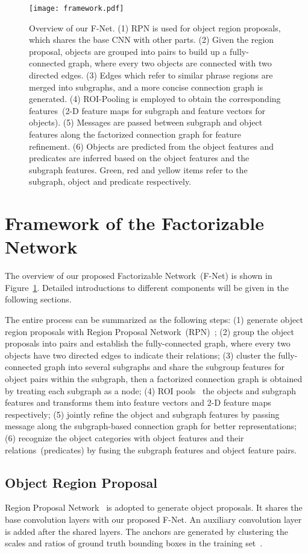 \documentclass[runningheads]{llncs}
\begin{document}
\begin{figure}[t]
	\texttt{[image: framework.pdf]}
	\caption{Overview of our F-Net. (1) RPN is used for object region proposals, which shares the base CNN with other parts. (2) Given the region proposal, objects are grouped into pairs to build up a fully-connected graph, where every two objects are connected with two directed edges. (3) Edges which refer to similar phrase regions are merged into subgraphs, and a more concise connection graph is generated. (4) ROI-Pooling is employed to obtain the corresponding features~(2-D feature maps for subgraph and feature vectors for objects). (5) Messages are passed between subgraph and object features along the factorized connection graph for feature refinement. (6) Objects are predicted from the object features and predicates are inferred based on the object features and the subgraph features. Green, red and yellow items refer to the subgraph, object and predicate respectively.}
	\label{fig:framework}
\end{figure}

\section{Framework of the Factorizable Network}

The overview of our proposed Factorizable Network~(F-Net) is shown in Figure~\ref{fig:framework}. Detailed introductions to different components will be given in the following sections.

The entire process can be summarized as the following steps: (1) generate object region proposals with Region Proposal Network~(RPN)~\cite{faster_rcnn}; (2) group the object proposals into pairs and establish the fully-connected graph, where every two objects have two directed edges to indicate their relations; (3) cluster the fully-connected graph into several subgraphs and share the subgroup features for object pairs within the subgraph, then a factorized connection graph is obtained by treating each subgraph as a node; (4) ROI pools~\cite{fast_rcnn,he2017mask} the objects and subgraph features and transforms them into feature vectors and 2-D feature maps respectively; (5) jointly refine the object and subgraph features by passing message along the subgraph-based connection graph for better representations; (6) recognize the object categories with object features and their relations~(predicates) by fusing the subgraph features and object feature pairs. 

\subsection{Object Region Proposal}
Region Proposal Network~\cite{faster_rcnn} is adopted to generate object proposals. It shares the base convolution layers with our proposed F-Net. An auxiliary convolution layer is added after the shared layers. The anchors are generated by clustering the scales and ratios of ground truth bounding boxes in the training set~\cite{li2017scene}. 
\end{document}
